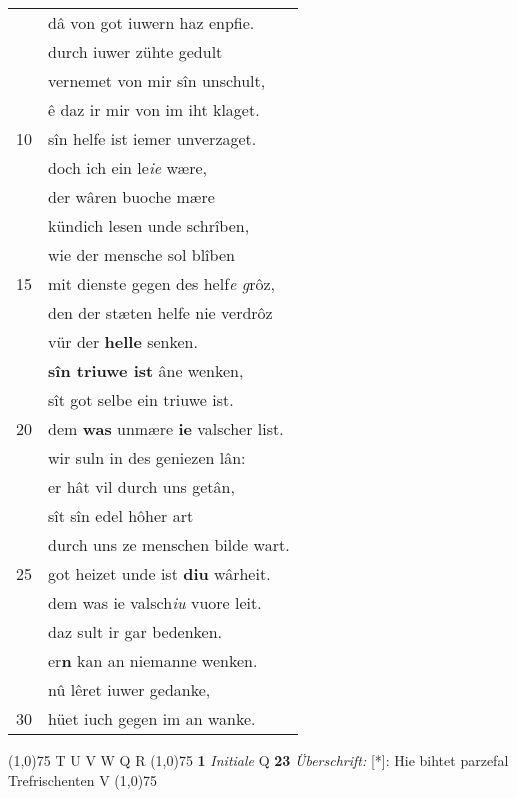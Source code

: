 \documentclass[8pt,a4paper,notitlepage]{article}
\begin{document}
\begin{table}[ht]
\begin{minipage}[t]{0.5\linewidth}
\begin{tabular}{rl}
 & dâ von got iuwern haz enpfie.\\ 
 & durch iuwer zühte gedult\\ 
 & vernemet von mir sîn unschult,\\ 
 & ê daz ir mir von im iht klaget.\\ 
10 & sîn helfe ist iemer unverzaget.\\ 
 & doch ich ein le\textit{ie} wære,\\ 
 & der wâren buoche mære\\ 
 & kündich lesen unde schrîben,\\ 
 & wie der mensche sol blîben\\ 
15 & mit dienste gegen des helf\textit{e} \textit{g}rôz,\\ 
 & den der stæten helfe nie verdrôz\\ 
 & vür der \textbf{helle} senken.\\ 
 & \textbf{sîn triuwe ist} âne wenken,\\ 
 & sît got selbe ein triuwe ist.\\ 
20 & dem \textbf{was} unmære \textbf{ie} valscher list.\\ 
 & wir suln in des geniezen lân:\\ 
 & er hât vil durch uns getân,\\ 
 & sît sîn edel hôher art\\ 
 & durch uns ze menschen bilde wart.\\ 
25 & got heizet unde ist \textbf{diu} wârheit.\\ 
 & dem was ie valsch\textit{iu} vuore leit.\\ 
 & daz sult ir gar bedenken.\\ 
 & er\textbf{n} kan an niemanne wenken.\\ 
 & nû lêret iuwer gedanke,\\ 
30 & hüet iuch gegen im an wanke.\\ 
\end{tabular}
\scriptsize
\line(1,0){75} \newline
T U V W Q R \newline
\line(1,0){75} \newline
\textbf{1} \textit{Initiale} Q  \textbf{23} \textit{Überschrift:} [*]: Hie bihtet parzefal Trefrischenten V  \newline
\line(1,0){75} \newline

\end{minipage}
\end{table}
\end{document}
